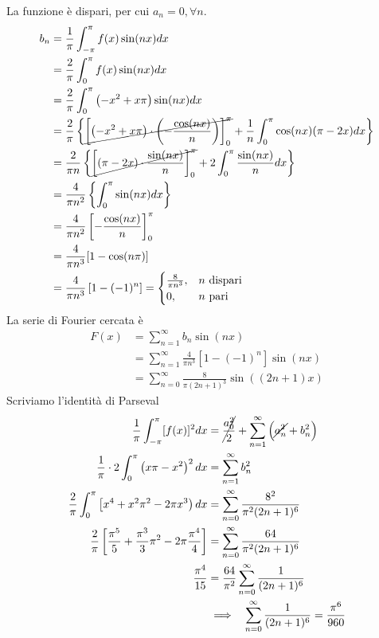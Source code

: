 La funzione è dispari, per cui $a_{n} = 0,\forall n$.
\begin{align*}
b_{n} & = \frac{1}{\pi }\int ^{\pi }_{ - \pi } f(x)\sin(nx) dx\\
 & = \frac{2}{\pi }\int ^{\pi }_{0} f(x)\sin(nx) dx\\
 & = \frac{2}{\pi }\int ^{\pi }_{0}\left(- x^{2} + x\pi \right)\sin(nx) dx\\
 & = \frac{2}{\pi }\left\{\cancel{\left[\left(- x^{2} + x\pi \right) \cdot \left(- \frac{\cos(nx)}{n}\right)\right]^{\pi }_{0}} + \frac{1}{n}\int ^{\pi }_{0}\cos(nx)(\pi - 2x) dx\right\}\\
 & = \frac{2}{\pi n}\left\{\cancel{\left[(\pi - 2x) \cdot \frac{\sin(nx)}{n}\right]^{\pi }_{0}} + 2\int ^{\pi }_{0}\frac{\sin(nx)}{n} dx\right\}\\
 & = \frac{4}{\pi n^{2}}\left\{\int ^{\pi }_{0}\sin(nx) dx\right\}\\
 & = \frac{4}{\pi n^{2}}\left[ - \frac{\cos(nx)}{n}\right]^{\pi }_{0}\\
 & = \frac{4}{\pi n^{3}}[ 1 - \cos(n\pi)]\\
 & = \frac{4}{\pi n^{3}}\left[ 1 - (- 1)^{n}\right] = \begin{cases}
\frac{8}{\pi n^{3}} , & n\ \text{dispari}\\
0, & n\ \text{pari}
\end{cases}
\end{align*}
La serie di Fourier cercata è
\begin{align*}
F(x) & = \sum\limits ^{\infty }_{n = 1} b_{n}\sin(nx)\\
 & = \sum\limits ^{\infty }_{n = 1}\frac{4}{\pi n^{3}}\left[ 1 - (- 1)^{n}\right]\sin(nx)\\
 & = \sum\limits ^{\infty }_{n = 0}\frac{8}{\pi (2n + 1)^{3}}\sin((2n + 1) x)
\end{align*}
Scriviamo l'identità di Parseval
\begin{align*}
\frac{1}{\pi }\int ^{\pi }_{ - \pi }[ f(x)]^{2} dx & = \cancel{\frac{a^{2}_{0}}{2}} + \sum\limits ^{\infty }_{n = 1}\left(\cancel{a^{2}_{n}} + b^{2}_{n}\right)\\
\frac{1}{\pi } \cdot 2\int ^{\pi }_{0}\left(x\pi - x^{2}\right)^{2} dx & = \sum\limits ^{\infty }_{n = 1} b^{2}_{n}\\
\frac{2}{\pi }\int ^{\pi }_{0}\left[ x^{4} + x^{2} \pi ^{2} - 2\pi x^{3}\right) dx & = \sum\limits ^{\infty }_{n = 0}\frac{8^{2}}{\pi ^{2}(2n + 1)^{6}}\\
\frac{2}{\pi }\left[\frac{\pi ^{5}}{5} + \frac{\pi ^{3}}{3} \pi ^{2} - 2\pi \frac{\pi ^{4}}{4}\right] & = \sum\limits ^{\infty }_{n = 0}\frac{64}{\pi ^{2}(2n + 1)^{6}}\\
\frac{\pi ^{4}}{15} & = \frac{64}{\pi ^{2}}\sum\limits ^{\infty }_{n = 0}\frac{1}{(2n + 1)^{6}}\\
 & \implies \ \ \sum\limits ^{\infty }_{n = 0}\frac{1}{(2n + 1)^{6}} = \frac{\pi ^{6}}{960}
\end{align*}

